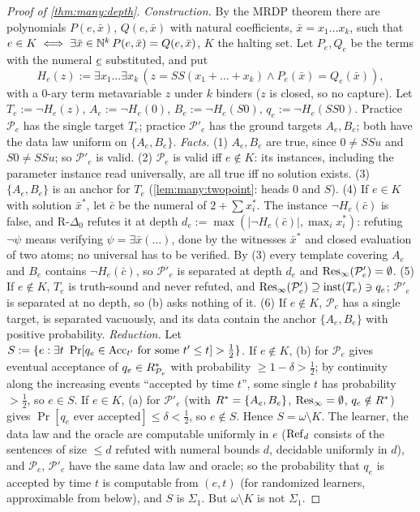 \begin{proof}[Proof of \cref{thm:many:depth}]
\emph{Construction.} By the MRDP theorem \citep{davis1961decision,matiyasevich1993hilbert} there are polynomials
$P(e,\bar x)$, $Q(e,\bar x)$ with natural coefficients, $\bar x=x_1\dots x_k$, such that $e\in K\iff\exists\bar x\in\mathbb{N}^k\,
P(e,\bar x)=Q(e,\bar x)$, $K$ the halting set. Let $P_e,Q_e$ be the terms with the numeral $\underline{e}$ substituted, and put
\[
H_e(z):=\exists x_1\dots\exists x_k\,(z=SS(x_1+\dots+x_k)\wedge P_e(\bar x)=Q_e(\bar x)),
\]
with a 0-ary term metavariable $z$ under $k$ binders ($z$ is closed, so no capture). Let $T_e:=\neg H_e(z)$, $A_e:=\neg H_e(0)$,
$B_e:=\neg H_e(S0)$, $q_e:=\neg H_e(SS0)$. Practice $\mathcal P_e$ has the single target $T_e$; practice $\mathcal P'_e$ has the ground targets
$A_e,B_e$; both have the data law uniform on $\{A_e,B_e\}$. \emph{Facts.} (1) $A_e,B_e$ are true, since $0\neq SSu$ and
$S0\neq SSu$; so $\mathcal P'_e$ is valid. (2) $\mathcal P_e$ is valid iff $e\notin K$: its instances, including the parameter instance read
universally, are all true iff no solution exists. (3) $\{A_e,B_e\}$ is an anchor for $T_e$ (\cref{lem:many:twopoint}: heads $0$
and $S$). (4) If $e\in K$ with solution $\bar x^*$, let $\bar c$ be the numeral of $2+\sum x_i^*$. The instance $\neg H_e(\bar
c)$ is false, and R-$\Delta_0$ refutes it at depth $d_e:=\max(|\neg H_e(\bar c)|,\max_ix^*_i)$: refuting $\neg\psi$ means
verifying $\psi=\exists\bar x(\dots)$, done by the witnesses $\bar x^*$ and closed evaluation of two atoms; no universal has
to be verified. By (3) every template covering $A_e$ and $B_e$ contains $\neg H_e(\bar c)$, so $\mathcal P'_e$ is separated at depth
$d_e$ and $\mathrm{Res}_\infty(\mathcal P'_e)=\emptyset$. (5) If $e\notin K$, $T_e$ is truth-sound and never refuted, and
$\mathrm{Res}_\infty(\mathcal P'_e)\supseteq\mathrm{inst}(T_e)\ni q_e$; $\mathcal P'_e$ is separated at no depth, so (b) asks nothing of it. (6) If $e\notin K$,
$\mathcal P_e$ has a single target, is separated vacuously, and its data contain the anchor $\{A_e,B_e\}$ with positive
probability.
\emph{Reduction.} Let $S:=\{e:\exists t\ \Pr[q_e\in\mathrm{Acc}_{t'}\text{ for some }t'\le t]>\frac12\}$. If $e\notin K$, (b) for
$\mathcal P_e$ gives eventual acceptance of $q_e\in R^{*}_{\mathcal P_e}$ with probability $\ge1-\delta>\frac12$; by continuity along the
increasing events ``accepted by time $t$'', some single $t$ has probability $>\frac12$, so $e\in S$. If $e\in K$, (a) for
$\mathcal P'_e$ (with $R^{*}=\{A_e,B_e\}$, $\mathrm{Res}_\infty=\emptyset$, $q_e\notin R^{*}$) gives $\Pr[q_e\text{ ever accepted}]\le
\delta<\frac12$, so $e\notin S$. Hence $S=\omega\setminus K$. The learner, the data law and the oracle are computable
uniformly in $e$ ($\mathrm{Ref}_d$ consists of the sentences of size $\le d$ refuted with numeral bounds $d$, decidable uniformly in
$d$), and $\mathcal P_e$, $\mathcal P'_e$ have the same data law and oracle; so the probability that $q_e$ is accepted by time $t$ is
computable from $(e,t)$ (for randomized learners, approximable from below), and $S$ is $\Sigma_1$. But $\omega\setminus K$
is not $\Sigma_1$.
\end{proof}
